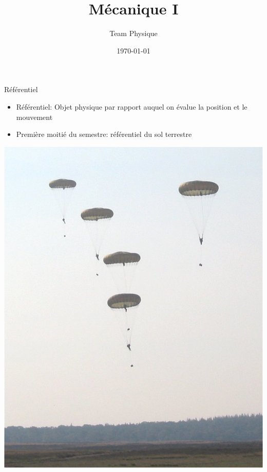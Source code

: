 \documentclass[xcolor=table]{beamer}
\title[Physique]{Mécanique I} %
\author{Team Physique} %
\institute[S4S] %
{
initiative S4S\\ %
\medskip
}
\date{\today} %
\begin{document}
\begin{frame}
\titlepage %
\end{frame}

\begin{frame}{Référentiel}
    \begin{itemize}
        \item Référentiel: Objet physique par rapport auquel on évalue la position et le mouvement
        
        \item Première moitié du semestre: référentiel du sol terrestre
    \end{itemize}
    
    \vspace{0.5 cm}
    \begin{center}
         \includegraphics[scale = 0.25]{Images/Parachutisten.jpg} \hspace{1cm}

\end{center}
\end{frame}
\end{document}
